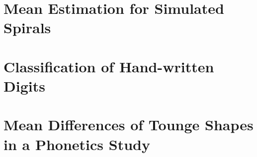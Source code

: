 \section{Mean Estimation for Simulated Spirals}
\section{Classification of Hand-written Digits}
\section{Mean Differences of Tounge Shapes in a Phonetics Study}

